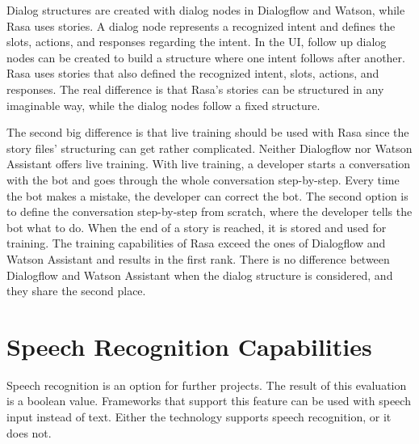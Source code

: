 Dialog structures are created with dialog nodes in Dialogflow and Watson, while Rasa uses stories.
A dialog node represents a recognized intent and defines the slots, actions, and responses regarding the intent.
In the UI, follow up dialog nodes can be created to build a structure where one intent follows after another.
Rasa uses stories that also defined the recognized intent, slots, actions, and responses.
The real difference is that Rasa's stories can be structured in any imaginable way, while the dialog nodes follow a fixed structure.

The second big difference is that live training should be used with Rasa since the story files' structuring can get rather complicated.
Neither Dialogflow nor Watson Assistant offers live training.
With live training, a developer starts a conversation with the bot and goes through the whole conversation step-by-step.
Every time the bot makes a mistake, the developer can correct the bot.
The second option is to define the conversation step-by-step from scratch, where the developer tells the bot what to do.
When the end of a story is reached, it is stored and used for training.
The training capabilities of Rasa exceed the ones of Dialogflow and Watson Assistant and results in the first rank. 
There is no difference between Dialogflow and Watson Assistant when the dialog structure is considered, and they share the second place.


\section*{Speech Recognition Capabilities}
Speech recognition is an option for further projects. 
The result of this evaluation is a boolean value.
Frameworks that support this feature can be used with speech input instead of text.
Either the technology supports speech recognition, or it does not. 


